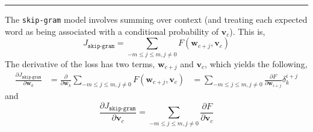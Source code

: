 \documentclass[letter,12pt]{article}
\begin{document}
\vspace{5mm}

\noindent\rule{\textwidth}{0.4pt}\vspace{5mm}

\noindent The \texttt{skip-gram} model involves summing over context (and treating each expected word as being associated with a conditional probability of ${\boldsymbol v}_{c}$). This is,
\begin{equation}
J_{\texttt{skip-gram}} =   \sum_{-m\le j\le m, j\neq0}F({\boldsymbol w}_{c+j}, {\boldsymbol v}_{c})
\end{equation}
The derivative of the loss has two terms, ${\boldsymbol w}_{c+j}$ and ${\boldsymbol v}_{c}$, which yields the following,
\begin{align}
\frac{\partial{J_{\texttt{skip-gram}}}}{\partial{\boldsymbol w}_{k}} & = \frac{\partial}{\partial{\boldsymbol w}_{k}}\sum_{-m\le j\le m, j\neq0}F({\boldsymbol w}_{c+j}, {\boldsymbol v}_{c})
     & = \sum_{-m\le j\le m, j\neq0} \frac{\partial{F}}{\partial{\boldsymbol w}_{i+j}}\delta^{i+j}_{k}
\end{align}
and
\begin{equation}
\frac{\partial{J_{\texttt{skip-gram}}}}{\partial{\boldsymbol v}_{c}} = \sum_{-m\le j\le m, j\neq0} \frac{\partial{F}}{\partial{\boldsymbol v}_{c}}
\end{equation}
\end{document}
